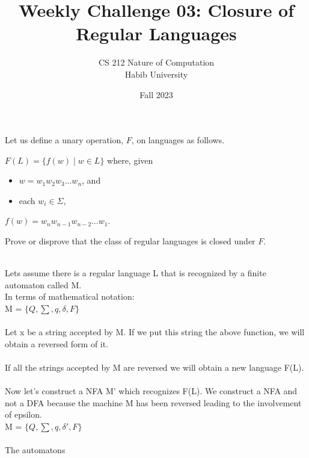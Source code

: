 \documentclass[a4paper]{exam}
\title{Weekly Challenge 03: Closure of Regular Languages}
\author{CS 212 Nature of Computation\\Habib University}
\date{Fall 2023}
\begin{document}
\maketitle

\begin{questions}
  

  Let us define a unary operation, $F$, on languages as follows.
  
  \begin{mdframed}
    $F(L) = \{ f(w) \mid w\in L\}$ where, given
    \begin{itemize}
    \item $w=w_1w_2w_3\ldots w_n$, and
    \item each $w_i\in\Sigma$,
    \end{itemize}
    $f(w) = w_nw_{n-1}w_{n-2}\ldots w_1$.
  \end{mdframed}

  Prove or disprove that the class of regular languages is closed under $F$.

  \begin{solution}
    \\
    Lets assume there is a regular language L that is recognized by a finite automaton called M.
    \\ 
    In terms of mathematical notation: \\
    M = $\{Q,\sum,q,\delta,F\}$
    \\ \\
    Let x be a string accepted by M. If we put this string the above function, we will obtain a reversed form of it.
    \\ \\
    If all the strings accepted by M are reversed we will obtain a new language F(L).
    \\ \\
    Now let's construct a NFA M' which recognizes F(L). We construct a NFA and not a DFA because the machine M has been reversed leading to the involvement of epsilon.
    \\ 
    M = $\{Q,\sum,q,\delta ',F\}$
    \\
    \\ 
    The automatons 
  \end{solution}
  
\end{questions}
\end{document}
